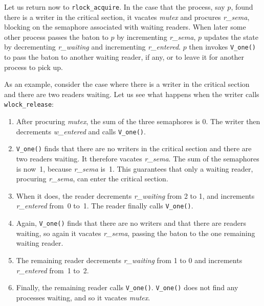 \documentclass{report}
\begin{document}
Let us return now to \texttt{rlock\_acquire}. In the case that the process,
say $p$,
found there is a writer in the critical section, it vacates
\textit{mutex} and procures \textit{r\_sema},
blocking on the semaphore associated
with waiting readers.  When later some other process passes the baton to
$p$ by incrementing \textit{r\_sema}, $p$ updates the state by decrementing
\textit{r\_waiting} and incrementing \textit{r\_entered}.  $p$
then invokes \texttt{V\_one()} to pass the baton to another waiting
reader, if any, or to leave it for another process to pick up.

As an example, consider the case where there is a writer in the critical
section and there are two readers waiting.  Let us see what happens when
the writer calls \texttt{wlock\_release}:
\begin{enumerate}
\item After procuring \textit{mutex},
the sum of the three semaphores is 0.  The writer then decrements
\textit{w\_entered} and calls \texttt{V\_one()}.
\item \texttt{V\_one()} finds that there are no writers in the critical section
and there are two readers waiting.  It therefore vacates \textit{r\_sema}.
The sum of the semaphores is now~1, because \textit{r\_sema} is~1.  This
guarantees that only a waiting reader, procuring \textit{r\_sema}, can enter
the critical section.
\item When it does, the reader decrements \textit{r\_waiting}
from 2 to 1, and increments \textit{r\_entered} from~0 to~1.
The reader finally calls \texttt{V\_one()}.
\item Again, \texttt{V\_one()} finds that there are no writers and
that there are readers waiting, so again it vacates \textit{r\_sema},
passing the baton to the one remaining waiting reader.
\item The remaining reader decrements \textit{r\_waiting} from 1 to 0 and
increments \textit{r\_entered} from~1 to~2.
\item Finally, the remaining reader  calls \texttt{V\_one()}.
\texttt{V\_one()} does not find any processes waiting,
and so it vacates \textit{mutex}.
\end{enumerate}
\end{document}
